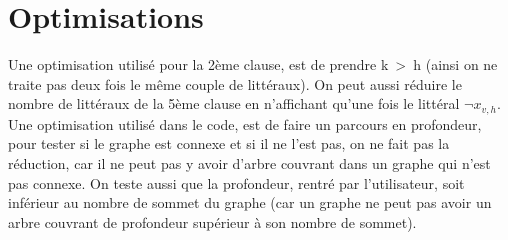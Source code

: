 \documentclass[10pt, a4paper]{article}
\begin{document}
\section {Optimisations}
Une optimisation utilisé pour la 2ème clause, est de prendre k~>~h (ainsi on ne traite pas deux fois le même couple de littéraux). On peut aussi réduire le nombre de littéraux de la 5ème clause en n'affichant qu'une fois le littéral $\neg x_{v,h}$.\newline
Une optimisation utilisé dans le code, est de faire un parcours en profondeur, pour tester si le graphe est connexe et si il ne l'est pas, on ne fait pas la réduction, car il ne peut pas y avoir d'arbre couvrant dans un graphe qui n'est pas connexe.
On teste aussi que la profondeur, rentré par l'utilisateur, soit inférieur au nombre de sommet du graphe (car un graphe ne peut pas avoir un arbre couvrant de profondeur supérieur à son nombre de sommet).
\end{document}
